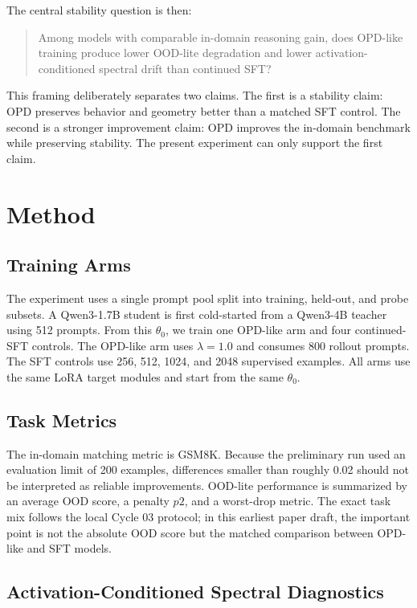 \documentclass[letterpaper]{article}
\begin{document}
The central stability question is then:
\begin{quote}
Among models with comparable in-domain reasoning gain, does OPD-like training produce lower OOD-lite degradation and lower activation-conditioned spectral drift than continued SFT?
\end{quote}

This framing deliberately separates two claims.
The first is a stability claim: OPD preserves behavior and geometry better than a matched SFT control.
The second is a stronger improvement claim: OPD improves the in-domain benchmark while preserving stability.
The present experiment can only support the first claim.

\section{Method}

\subsection{Training Arms}

The experiment uses a single prompt pool split into training, held-out, and probe subsets.
A Qwen3-1.7B student is first cold-started from a Qwen3-4B teacher using 512 prompts.
From this $\theta_0$, we train one OPD-like arm and four continued-SFT controls.
The OPD-like arm uses $\lambda=1.0$ and consumes 800 rollout prompts.
The SFT controls use 256, 512, 1024, and 2048 supervised examples.
All arms use the same LoRA target modules and start from the same $\theta_0$.

\subsection{Task Metrics}

The in-domain matching metric is GSM8K.
Because the preliminary run used an evaluation limit of 200 examples, differences smaller than roughly 0.02 should not be interpreted as reliable improvements.
OOD-lite performance is summarized by an average OOD score, a penalty $p2$, and a worst-drop metric.
The exact task mix follows the local Cycle 03 protocol; in this earliest paper draft, the important point is not the absolute OOD score but the matched comparison between OPD-like and SFT models.

\subsection{Activation-Conditioned Spectral Diagnostics}
\end{document}
